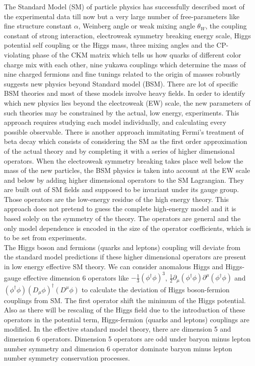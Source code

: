 \documentclass[final,3p]{CSP}
\begin{document}
The Standard Model (SM) of particle physics has successfully described most of the experimental data till now but a very large 
number of free-parameters like fine structure constant $\alpha$, Weinberg angle or weak mixing angle $\theta_W$, the coupling 
constant of strong interaction, electroweak symmetry breaking energy scale, Higgs potential self coupling or the Higgs mass, 
three mixing angles and the CP-violating phase of the CKM matrix which tells us how quarks of 
different color charge mix with 
each other, nine yukawa couplings which determine the mass of nine charged fermions and fine 
tunings related to the origin of 
masses robustly suggests new physics beyond Standard model (BSM). There are lot of specific 
BSM theories and most of these 
models involve heavy fields. In order to identify which new physics lies beyond the 
electroweak (EW) scale, the new parameters 
of such theories may be constrained by the actual, low energy, experiments. This approach 
requires studying each model 
individually, and calculating every possible observable. There is another approach immitating 
Fermi's treatment of beta decay 
which consists of considering the SM as the first order approximation of the actual theory 
and by completing it with a series 
of higher dimensional operators. When the electroweak symmetry breaking takes place well 
below the mass of the new particles, 
the BSM physics is taken into account at the EW scale and below by adding higher dimensional 
operators to the SM Lagrangian. 
They are built out of SM fields and supposed to be invariant under its gauge group. Those 
operators are the low-energy residue 
of the high energy theory. This approach does not pretend to guess the complete high-energy 
model and it is based solely on 
the symmetry of the  theory. The operators are general and the only model dependence is 
encoded in the size of the operator 
coefficients, which is to be set from experiments.\\

The Higgs boson and fermions (quarks and leptons) coupling will deviate from the standard 
model predictions if these higher 
dimensional operators are present in low energy effective SM theory. We can consider 
anomalous Higgs and Higgs-gauge effective 
dimension 6 operators like $-\frac{1}{3}(\phi^{\dagger}\phi)^3$, $\frac{1}{2} \partial_{\mu} 
(\phi^{\dagger} \phi) 
\partial^{\mu}(\phi^{\dagger} \phi)$ and $(\phi^{\dagger} \phi)(D_{\mu} \phi)^{\dagger} 
(D^{\mu} \phi)$ to calculate the 
deviation of Higgs boson-fermion couplings from SM. The first operator shift the minimum of 
the Higgs potential. Also as there 
will be rescaling of the Higgs field due to the introduction of these operators in the 
potential term, Higgs-fermion (quarks 
and leptons) couplings are modified. In the effective standard model theory, there are 
dimension 5 and dimension 6 
operators. Dimension 5 operators are odd under baryon minus lepton number symmetry and 
dimension 6 operator dominate baryon 
minus lepton number symmetry conservation processes.\\
   
\end{document}
